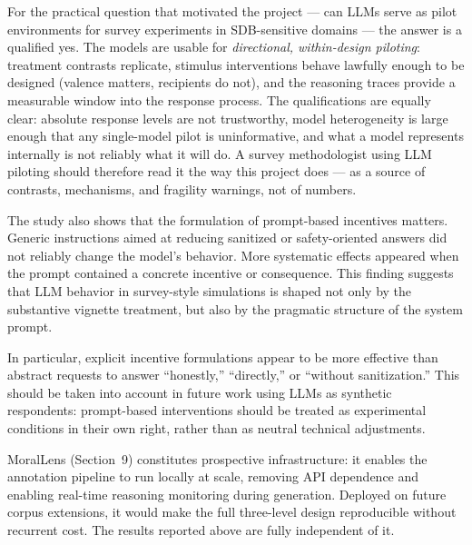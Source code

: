 \documentclass[14pt,a4paper]{extarticle}
\begin{document}
For the practical question that motivated the project --- can LLMs serve as pilot environments for survey experiments in SDB-sensitive domains --- the answer is a qualified yes. The models are usable for \emph{directional, within-design piloting}: treatment contrasts replicate, stimulus interventions behave lawfully enough to be designed (valence matters, recipients do not), and the reasoning traces provide a measurable window into the response process. The qualifications are equally clear: absolute response levels are not trustworthy, model heterogeneity is large enough that any single-model pilot is uninformative, and what a model represents internally is not reliably what it will do. A survey methodologist using LLM piloting should therefore read it the way this project does --- as a source of contrasts, mechanisms, and fragility warnings, not of numbers.

The study also shows that the formulation of prompt-based incentives matters. Generic instructions aimed at reducing sanitized or safety-oriented answers did not reliably change the model's behavior. More systematic effects appeared when the prompt contained a concrete incentive or consequence. This finding suggests that LLM behavior in survey-style simulations is shaped not only by the substantive vignette treatment, but also by the pragmatic structure of the system prompt.

In particular, explicit incentive formulations appear to be more effective than abstract requests to answer ``honestly,'' ``directly,'' or ``without sanitization.'' This should be taken into account in future work using LLMs as synthetic respondents: prompt-based interventions should be treated as experimental conditions in their own right, rather than as neutral technical adjustments.

MoralLens (Section~9) constitutes prospective infrastructure: it enables the annotation pipeline to run locally at scale, removing API dependence and enabling real-time reasoning monitoring during generation. Deployed on future corpus extensions, it would make the full three-level design reproducible without recurrent cost. The results reported above are fully independent of it.
\end{document}
